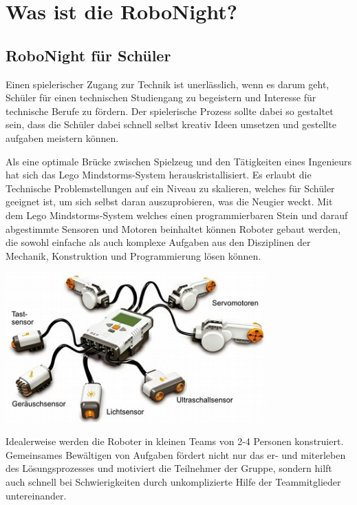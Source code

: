 \chapter{Was ist die RoboNight?}

\section{RoboNight für Schüler}
Einen spielerischer Zugang zur Technik ist unerlässlich, wenn es darum geht, Schüler für einen technischen Studiengang zu begeistern und Interesse für technische Berufe zu fördern. Der spielerische Prozess sollte dabei so gestaltet sein, dass die Schüler dabei schnell selbst kreativ Ideen umsetzen und gestellte aufgaben meistern können. 

Als eine optimale Brücke zwischen Spielzeug und den Tätigkeiten eines Ingenieurs hat sich das Lego Mindstorms-System herauskristallisiert. Es erlaubt die Technische Problemstellungen auf ein Niveau zu skalieren, welches für Schüler geeignet ist, um sich selbst daran auszuprobieren, was die Neugier weckt. Mit dem Lego Mindstorms-System welches einen programmierbaren Stein und darauf abgestimmte Sensoren und Motoren beinhaltet können Roboter gebaut werden, die sowohl einfache als auch komplexe Aufgaben aus den Disziplinen der Mechanik, Konstruktion und Programmierung lösen können.

\begin{capfigure}
	\includegraphics[width=10cm]{images/mindstorms.jpg}
 \end{capfigure}

Idealerweise werden die Roboter in kleinen Teams von 2-4 Personen konstruiert. Gemeinsames Bewältigen von Aufgaben fördert nicht nur das er- und miterleben des Lösungsprozesses und motiviert die Teilnehmer der Gruppe, sondern hilft auch schnell bei Schwierigkeiten durch unkomplizierte Hilfe der Teammitglieder untereinander.

